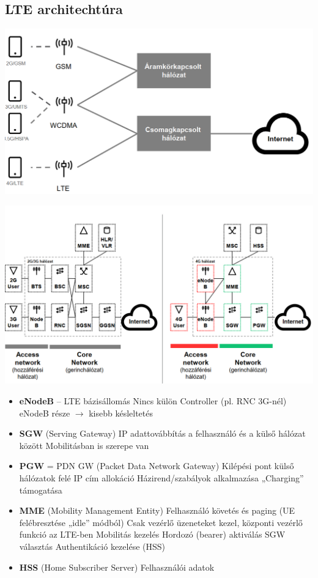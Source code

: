 \documentclass[10pt,a4paper]{article}
\begin{document}
\subsection{LTE architechtúra}
\begin{center}
	\includegraphics[width=0.5\linewidth]{src/LTEarch}
\end{center}
\begin{center}
	\includegraphics[width=0.8\linewidth]{src/LTEarch2}
\end{center}
\begin{itemize}
	\item \textbf{eNodeB} – LTE bázisállomás
	\subitem Nincs külön Controller
	(pl. RNC 3G-nél)
	\subitem eNodeB része $\rightarrow$ kisebb
	késleltetés
	\item \textbf{SGW} (Serving Gateway)
	\subitem IP adattovábbítás a felhasználó
	és a külső hálózat között
	\subitem Mobilitásban is szerepe van
	\item  \textbf{PGW} = PDN GW (Packet Data
	Network Gateway)
	\subitem Kilépési pont külső hálózatok
	felé
	\subitem IP cím allokáció
	\subitem Házirend/szabályok
	alkalmazása
	\subitem „Charging” támogatása
	\item \textbf{MME} (Mobility
	Management Entity)
	\subitem Felhasználó követés és
	paging (UE felébresztése
	„idle” módból)
	\subitem Csak vezérlő üzeneteket
	kezel, központi vezérlő
	funkció az LTE-ben
	\subitem Mobilitás kezelés
	\subitem Hordozó (bearer) aktiválás
	\subitem SGW választás
	\subitem Authentikáció kezelése
	(HSS)
	\item  \textbf{HSS} (Home Subscriber
	Server)
	\subitem Felhasználói adatok
\end{itemize}
\end{document}
